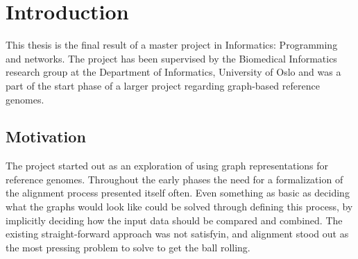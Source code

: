 \documentclass[thesis.tex]{subfiles}
\begin{document}
\chapter{Introduction}
This thesis is the final result of a master project in Informatics: Programming and networks. The project has been supervised by the Biomedical Informatics research group at the Department of Informatics, University of Oslo and was a part of the start phase of a larger project regarding graph-based reference genomes.
\section{Motivation}
The project started out as an exploration of using graph representations for reference genomes. Throughout the early phases the need for a formalization of the alignment process presented itself often. Even something as basic as deciding what the graphs would look like could be solved through defining this process, by implicitly deciding how the input data should be compared and combined. The existing straight-forward approach was not satisfyin, and alignment stood out as the most pressing problem to solve to get the ball rolling. 
\end{document}
